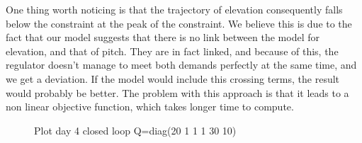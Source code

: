 One thing worth noticing is that the trajectory of elevation consequently falls below the constraint at the peak of the constraint. We believe this is due to the fact that our model suggests that there is no link between the model for elevation, and that of pitch. They are in fact linked, and because of this, the regulator doesn't manage to meet both demands perfectly at the same time, and we get a deviation. If the model would include this crossing terms, the result would probably be better. The problem with this approach is that it leads to a non linear objective function, which takes longer time to compute.
\begin{figure}[htb]
	\centering
	\caption{Plot day 4 closed loop Q=diag(20 1 1 1 30 10)}
	\label{fig:day4_cl_plot_20_1_1_1_30_10}
\end{figure}




